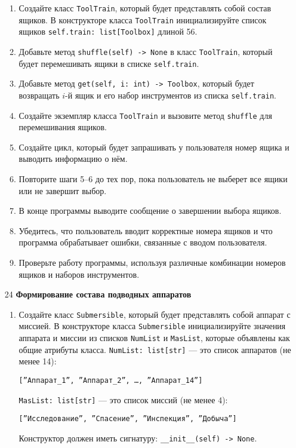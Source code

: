 \begin{enumerate}
\begin{enumerate}
    \item Создайте класс \texttt{ToolTrain}, который будет представлять собой состав ящиков. В конструкторе класса \texttt{ToolTrain} инициализируйте список ящиков \texttt{self.train: list[Toolbox]} длиной 56.

    \item Добавьте метод \texttt{shuffle(self) -> None} в класс \texttt{ToolTrain}, который будет перемешивать ящики в списке \texttt{self.train}.

    \item Добавьте метод \texttt{get(self, i: int) -> Toolbox}, который будет возвращать $i$-й ящик и его набор инструментов из списка \texttt{self.train}.

    \item Создайте экземпляр класса \texttt{ToolTrain} и вызовите метод \texttt{shuffle} для перемешивания ящиков.

    \item Создайте цикл, который будет запрашивать у пользователя номер ящика и выводить информацию о нём.

    \item Повторите шаги 5–6 до тех пор, пока пользователь не выберет все ящики или не завершит выбор.

    \item В конце программы выводите сообщение о завершении выбора ящиков.

    \item Убедитесь, что пользователь вводит корректные номера ящиков и что программа обрабатывает ошибки, связанные с вводом пользователя.

    \item Проверьте работу программы, используя различные комбинации номеров ящиков и наборов инструментов.
\end{enumerate}

\item[24] \textbf{Формирование состава подводных аппаратов}
\begin{enumerate}
    \item Создайте класс \texttt{Submersible}, который будет представлять собой аппарат с миссией. В конструкторе класса \texttt{Submersible} инициализируйте значения аппарата и миссии из списков \texttt{NumList} и \texttt{MasList}, которые объявлены как общие атрибуты класса. \texttt{NumList: list[str]} — это список аппаратов (не менее 14): 
    \begin{center}
        \texttt{[''Аппарат\_1'', ''Аппарат\_2'', \dots, ''Аппарат\_14'']}
    \end{center}
    \texttt{MasList: list[str]} — это список миссий (не менее 4):
    \begin{center}
        \texttt{[''Исследование'', ''Спасение'', ''Инспекция'', ''Добыча'']}
    \end{center}
    Конструктор должен иметь сигнатуру: \texttt{\_\_init\_\_(self) -> None}.


\end{enumerate}
\end{enumerate}
